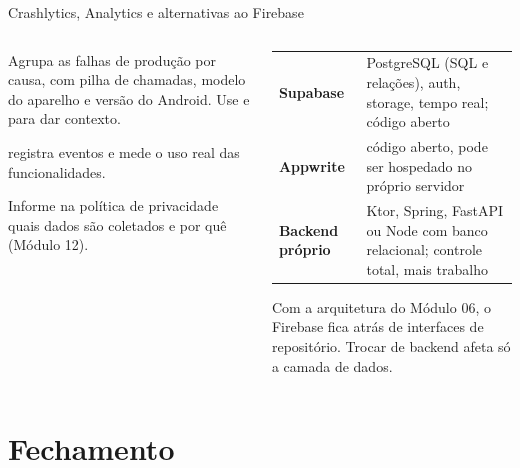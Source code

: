\documentclass[aspectratio=169,10pt]{beamer}
\begin{document}
\begin{frame}{Crashlytics, Analytics e alternativas ao Firebase}
  \begin{columns}[T]
    \begin{column}{0.48\textwidth}
      \begin{conceito}[Crashlytics]
        Agrupa as falhas de produção por causa, com pilha de chamadas, modelo do aparelho e versão do Android. Use  e  para dar contexto.
      \end{conceito}
      \begin{conceito}[Analytics]
         registra eventos e mede o uso real das funcionalidades.
      \end{conceito}
      \begin{atencao}[LGPD]
        Informe na política de privacidade quais dados são coletados e por quê (Módulo 12).
      \end{atencao}
    \end{column}
    \begin{column}{0.5\textwidth}
      \scriptsize
      \begin{tabularx}{\linewidth}{@{}l L@{}}
        \toprule
         &  \\
        \midrule
        \textbf{Supabase} & PostgreSQL (SQL e relações), auth, storage, tempo real; código aberto \\
        \textbf{Appwrite} & código aberto, pode ser hospedado no próprio servidor \\
        \textbf{Backend próprio} & Ktor, Spring, FastAPI ou Node com banco relacional; controle total, mais trabalho \\
        \bottomrule
      \end{tabularx}
      \begin{dica}
        Com a arquitetura do Módulo 06, o Firebase fica atrás de interfaces de repositório. Trocar de backend afeta só a camada de dados.
      \end{dica}
    \end{column}
  \end{columns}
\end{frame}

\section{Fechamento}
\end{document}
